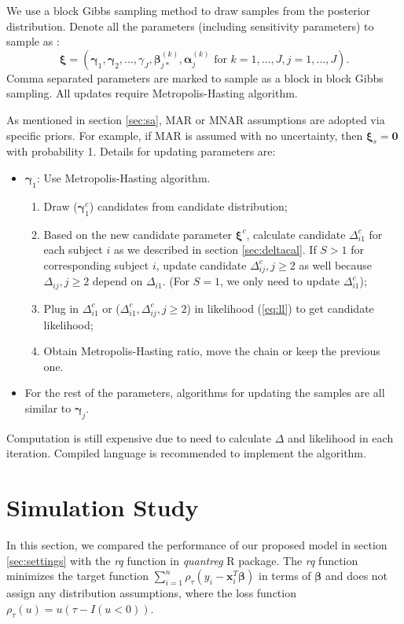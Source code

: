 \documentclass[12pt]{article}
\begin{document}
We use a  block Gibbs sampling method to draw samples from the
posterior distribution. Denote all the parameters (including
sensitivity parameters) to sample as :
\begin{displaymath}
  \bm \xi = \left( \bm \gamma_1, \bm \gamma_2, \ldots, \gamma_J,
    \bm \beta_{j*}^{(k)}, \bm \alpha_j^{(k)}
    \text{ for } k = 1, \ldots, J, j = 1, \ldots, J \right).
\end{displaymath}
Comma separated parameters are marked to sample as a block in block
Gibbs sampling.  All updates require Metropolis-Hasting
algorithm.

As mentioned in section \ref{sec:sa}, MAR or MNAR assumptions are
adopted via specific priors. For example, if MAR is assumed with no
uncertainty, then $ \bm \xi _s= \bm 0$ with probability 1. Details for
updating parameters are:

\begin{itemize}
\item $\bm \gamma_{1} $: Use Metropolis-Hasting algorithm.
  \begin{enumerate}
  \item Draw ($\bm \gamma_{1}^c$) candidates from candidate
    distribution;
  \item Based on the new candidate parameter $\bm \xi^c$, calculate
    candidate $\Delta_{i1}^c$ for each subject $i$ as we described in
    section \ref{sec:deltacal}. If $S > 1$ for corresponding subject
    $i$, update candidate $\Delta_{ij}^c, j \geq 2$ as well because
    $\Delta_{ij}, j \geq 2$ depend on $\Delta_{i1}$. (For $S = 1$, we
    only need to update $\Delta_{i1}^c$);
  \item Plug in $\Delta_{i1}^c$ or ($\Delta_{i1}^c, \Delta_{ij}^c, j
    \geq 2$) in likelihood (\ref{eq:ll}) to get candidate likelihood;
  \item Obtain Metropolis-Hasting ratio, move the chain or keep the
    previous one.
  \end{enumerate}
\item For the rest of the parameters, algorithms for updating the
  samples are all similar to $\bm \gamma_j$.
\end{itemize}

Computation is still expensive due to need to calculate $\Delta$ and
likelihood in each iteration. Compiled language is recommended to
implement the algorithm.

\section{Simulation Study}
\label{sec:simulation}
In this section, we compared the performance of our proposed model in
section \ref{sec:settings} with the \textit{rq} function in
\textit{quantreg} R package. The \textit{rq} function minimizes the
target function $\sum_{i=1}^n \rho_{\tau} (y_i - \bm x_i^T \bm \beta)$
in terms of $\bm \beta$ and does not assign any distribution
assumptions, where the loss function $\rho_{\tau} (u) = u(\tau - I(u <
0))$.
\end{document}

